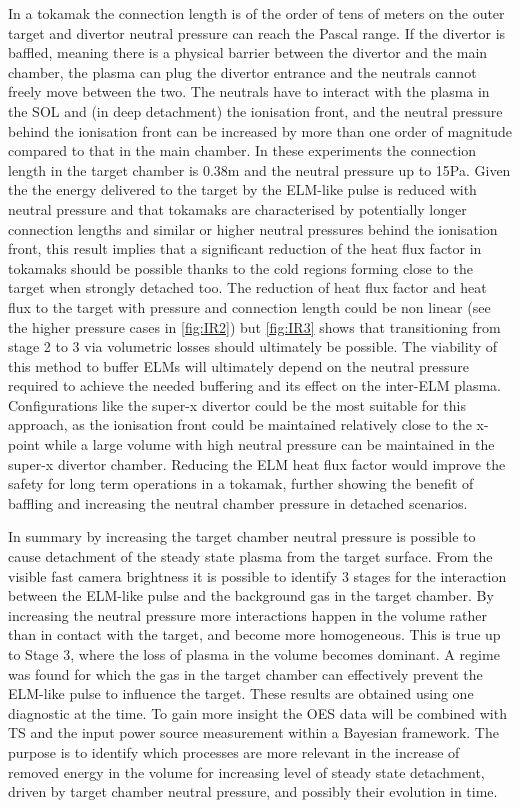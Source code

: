 In a tokamak the connection length is of the order of tens of meters on the outer target and divertor neutral pressure can reach the Pascal range\cite{Kallenbach2018}. If the divertor is baffled, meaning there is a physical barrier between the divertor and the main chamber, the plasma can plug the divertor entrance and the neutrals cannot freely move between the two. The neutrals have to interact with the plasma in the SOL and (in deep detachment) the ionisation front, and the neutral pressure behind the ionisation front can be increased by more than one order of magnitude compared to that in the main chamber.\cite{Galassi2020,Pitcher2000,Niemczewski1997} In these experiments the connection length in the target chamber is 0.38m and the neutral pressure up to 15Pa. Given the the energy delivered to the target by the ELM-like pulse is reduced with neutral pressure and that tokamaks are characterised by potentially longer connection lengths and similar or higher neutral pressures behind the ionisation front, this result implies that a significant reduction of the heat flux factor in tokamaks should be possible thanks to the cold regions forming close to the target when strongly detached too. The reduction of heat flux factor and heat flux to the target with pressure and connection length could be non linear (see the higher pressure cases in \autoref{fig:IR2}) but \autoref{fig:IR3} shows that transitioning from stage 2 to 3 via volumetric losses should ultimately be possible. The viability of this method to buffer ELMs will ultimately depend on the neutral pressure required to achieve the needed buffering and its effect on the inter-ELM plasma. Configurations like the super-x divertor could be the most suitable for this approach, as the ionisation front could be maintained relatively close to the x-point while a large volume with high neutral pressure can be maintained in the super-x divertor chamber. Reducing the ELM heat flux factor would improve the safety for long term operations in a tokamak, further showing the benefit of baffling and increasing the neutral chamber pressure in detached scenarios.

In summary by increasing the target chamber neutral pressure is possible to cause detachment of the steady state plasma from the target surface. From the visible fast camera brightness it is possible to identify 3 stages for the interaction between the ELM-like pulse and the background gas in the target chamber. By increasing the neutral pressure more interactions happen in the volume rather than in contact with the target, and become more homogeneous. This is true up to Stage 3, where the loss of plasma in the volume becomes dominant. A regime was found for which the gas in the target chamber can effectively prevent the ELM-like pulse to influence the target.
These results are obtained using one diagnostic at the time. To gain more insight the OES data will be combined with TS and the input power source measurement within a Bayesian framework. The purpose is to identify which processes are more relevant in the increase of removed energy in the volume for increasing level of steady state detachment, driven by target chamber neutral pressure, and possibly their evolution in time.


